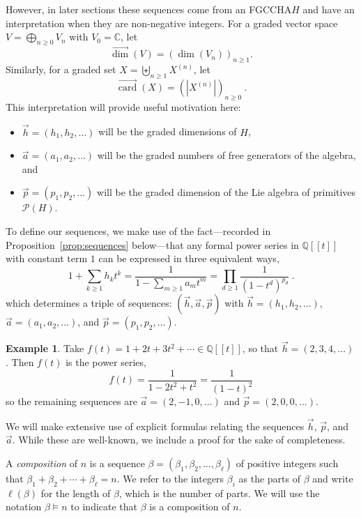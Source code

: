 \documentclass[11pt]{amsart}
\newcommand{\defncolor}{\color{darkred}}
\newcommand{\defn}[1]{{\defncolor\emph{#1}}} %
\theoremstyle{definition}
\newtheorem{example}[theorem]{Example}
\numberwithin{equation}{section}
\def\CC{{\mathbb C}}
\def\QQ{{\mathbb Q}}
\newcommand{\FGCCHA}{\textsf{FGCCHA}\xspace}
\newcommand{\vecdim}{\overrightarrow{\dim}}
\newcommand{\veccard}{\overrightarrow{\operatorname{card}}}
\begin{document}
However, in later sections these sequences come from an \FGCCHA $H$ and have an interpretation when they are non-negative integers.
For a graded vector space $V = \bigoplus_{n \ge 0} V_{n}$ with $V_{0} = \CC$, let
\[
\vecdim(V) = \left( \dim(V_{n}) \right)_{n \ge 1}.
\]
Similarly, for a graded set $X = \biguplus_{n \ge 1} X^{(n)}$, let
\[
\veccard(X) = \left( |X^{(n)}| \right)_{n \ge 0}~.
\]
This interpretation will provide useful motivation here:
\begin{itemize}
\item $\vec{h} = (h_{1}, h_{2}, \ldots)$ will be the graded dimensions of $H$,

\item $\vec{a} = (a_{1}, a_{2}, \ldots)$ will be the graded numbers of free generators of the algebra, and 

\item $\vec{p} = (p_{1}, p_{2}, \ldots)$ will be the graded dimension of the Lie algebra of primitives $\mathcal{P}(H)$.

\end{itemize}

To define our sequences, we make use of the fact---recorded in Proposition~\ref{prop:sequences}
below---that any formal power series in $\QQ[\![t]\!]$ with constant term $1$
can be expressed in three equivalent ways,
\begin{equation}
\label{eq:gf_relation}
1 + \sum_{k \geq 1} h_k t^k = \frac{1}{1 - \sum_{m \geq 1} a_m t^m} = \prod_{d \geq 1} \frac{1}{(1-t^d)^{p_d}}~.
\end{equation}
which determines a triple of sequences: $(\vec{h}, \vec{a}, \vec{p})$ with $\vec{h} = (h_{1}, h_{2}, \ldots)$, $\vec{a} = (a_{1}, a_{2}, \ldots)$, and $\vec{p} = (p_{1}, p_{2}, \ldots)$.

\begin{example}
Take $f(t) = 1 + 2t + 3 t^{2} + \cdots \in \QQ[\![t]\!]$, so that $\vec{h} = (2, 3, 4, \ldots)$.
Then $f(t)$ is the power series,
\[
f(t) = \frac{1}{1 - 2 t^{2} + t^{2}} = \frac{1}{(1-t)^{2}}
\]
so the remaining sequences are $\vec{a} = (2, -1, 0, \ldots)$ and $\vec{p} = (2, 0, 0, \ldots)$.
\end{example}

We will make extensive use of explicit formulas relating the sequences $\vec{h}$, $\vec{p}$, and $\vec{a}$.  While these are well-known, we include a proof for the sake of completeness.  

A \defn{composition} of $n$ is a sequence $\beta = (\beta_1, \beta_2, \ldots, \beta_\ell)$ of positive integers such that $\beta_{1} + \beta_{2} + \cdots + \beta_{\ell} = n$.  
We refer to the integers $\beta_{i}$ as the parts of $\beta$ and write $\ell(\beta)$ for the length of $\beta$, which is the number of parts.  
We will use the notation $\beta \vDash n$ to indicate that $\beta$ is a composition of $n$.
\end{document}
